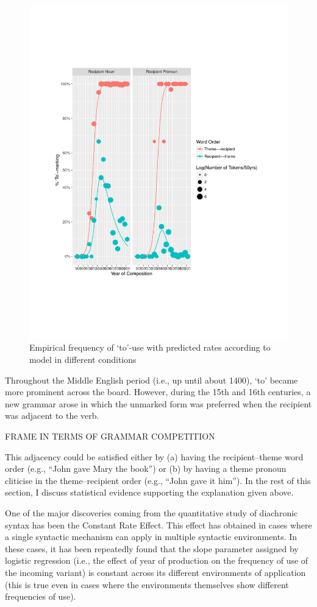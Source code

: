 	\begin{figure}[p!]
		\includegraphics[width=.95\linewidth]{../images/to-marking-graph}
		\caption{Empirical frequency of `to'-use with predicted rates according to model in different conditions}
		\label{fig:to-use}
	\end{figure}

	Throughout the Middle English period (i.e., up until about 1400), `to' became more prominent across the board. However, during the 15th and 16th centuries, a new grammar arose in which the unmarked form was preferred when the recipient was adjacent to the verb.

	FRAME IN TERMS OF GRAMMAR COMPETITION
	
	This adjacency could be satisfied either by (a) having the recipient--theme word order (e.g., ``John gave Mary the book'') or (b) by having a theme pronoun cliticise in the theme--recipient order (e.g., ``John gave it him''). In the rest of this section, I discuss statistical evidence supporting the explanation given above.

	One of the major discoveries coming from the quantitative study of diachronic syntax has been the Constant Rate Effect. This effect has obtained in cases where a single syntactic mechanism can apply in multiple syntactic environments. In these cases, it has been repeatedly found that the slope parameter assigned by logistic regression (i.e., the effect of year of production on the frequency of use of the incoming variant) is constant across its different environments of application (this is true even in cases where the environments themselves show different frequencies of use). 

